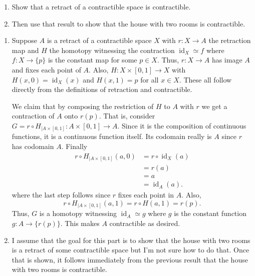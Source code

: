 \documentclass[12 pt, letterpaper]{hmcpset}
\begin{document}
\pagebreak

\begin{problem}[Problem 3]
	\begin{enumerate}
		\item Show that a retract of a contractible space is contractible.

		\item Then use that result to show that the house with two rooms is contractible.
	\end{enumerate}
\end{problem}

\begin{solution}
	\begin{enumerate}
		\item Suppose $A$ is a retract of a contractible space $X$ with $r : X \to A$ the retraction map and $H$ the homotopy witnessing the contraction $\operatorname{id}_{X} \simeq f$ where $f : X \to \{ p \}$ is the constant map for some $p \in X$. Thus, $r : X \to A$ has image $A$ and fixes each point of $A$. Also, $H : X \times [0, 1] \to X$ with $H(x, 0) = \operatorname{id}_{X}(x)$ and $H(x, 1) = p$ for all $x \in X$. These all follow directly from the definitions of retraction and contractible.

			We claim that by composing the restriction of $H$ to $A$ with $r$ we get a contraction of $A$ onto $r(p)$. That is, consider $G = r \circ H_{\mid A \times [0, 1]} : A \times [0, 1] \to A$. Since it is the composition of continuous functions, it is a continuous function itself. Its codomain really is $A$ since $r$ has codomain $A$. Finally
			\begin{align*}
				r \circ H_{\mid A \times [0, 1]}(a, 0) & = r \circ \operatorname{id}_{X}(a) \\
								       & = r(a) \\
								       & = a \\
								       & = \operatorname{id}_{A}(a).
			\end{align*}
			where the last step follows since $r$ fixes each point in $A$. Also,
			\[
				r \circ H_{\mid A \times [0, 1]}(a, 1) = r \circ H(a, 1) = r(p).
			\]
			Thus, $G$ is a homotopy witnessing $\operatorname{id}_{A} \simeq g$ where $g$ is the constant function $g : A \to \{ r(p) \}$. This makes $A$ contractible as desired.

		\item I assume that the goal for this part is to show that the house with two rooms is a retract of some contractible space but I'm not sure how to do that. Once that is shown, it follows immediately from the previous result that the house with two rooms is contractible.


\end{enumerate}
\end{solution}
\end{document}

